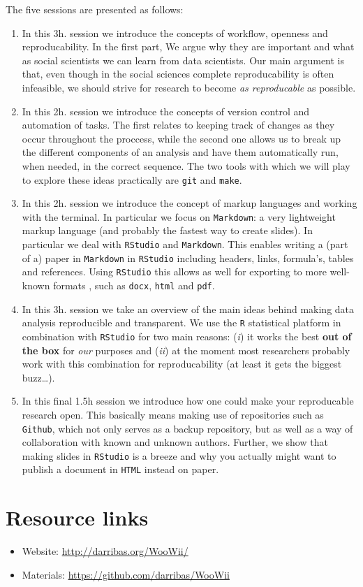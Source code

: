 \documentclass[scrartcl,a4paper,utopia,10pt]{article}
\begin{document}
The five sessions are presented as follows:
\begin{enumerate}
\item In this 3h. session we introduce the concepts of workflow, openness and
    reproducability. In the first part, We argue why they are important and
    what as social scientists we can learn from data scientists. Our main
    argument is that, even though in the social sciences complete
    reproducability is often infeasible, we should strive for research to
    become \emph{as reproducable} as possible.
\item In this 2h. session we introduce the concepts of version control and
    automation of tasks. The first relates to keeping track of changes as they
    occur throughout the proccess, while the second one allows us to break up
    the different components of an analysis and have them automatically run,
    when needed, in the correct sequence. The two tools with which we will
    play to explore these ideas practically are \texttt{git} and
    \texttt{make}.
\item In this 2h. session we introduce the concept of markup languages and
    working with the terminal. In particular we focus on \texttt{Markdown}: a
    very lightweight markup language (and probably the fastest way to create
    slides). In particular we deal with \texttt{RStudio} and
    \texttt{Markdown}. This enables writing a (part of a) paper in
    \texttt{Markdown} in \texttt{RStudio} including headers, links, formula's,
    tables and references. Using \texttt{RStudio} this allows as well for
    exporting to more well-known formats , such as \texttt{docx},
    \texttt{html} and \texttt{pdf}.
\item In this 3h. session we take an overview of the main ideas behind making
    data analysis reproducible and transparent. We use the \texttt{R}
    statistical platform in combination with \texttt{RStudio} for two main
    reasons: (\emph{i}) it works the best \textbf{out of the box} for
    \emph{our} purposes and (\emph{ii}) at the moment most researchers
    probably work with this combination for reproducability (at least it gets
    the biggest buzz\ldots{}).
\item In this final 1.5h session we introduce how one could make your
    reproducable research open. This basically means making use of
    repositories such as \texttt{Github}, which not only serves as a backup
    repository, but as well as a way of collaboration with known and unknown
    authors. Further, we show that making slides in \texttt{RStudio} is a
    breeze and why you actually might want to publish a document in
    \texttt{HTML} instead on paper.
\end{enumerate}
\section{Resource links}
\label{sec-3}

\begin{itemize}
\item Website: \href{http://darribas.org/WooWii/}{http://darribas.org/WooWii/}
\item Materials: \href{https://github.com/darribas/WooWii}{https://github.com/darribas/WooWii}
\end{itemize}
\end{document}
